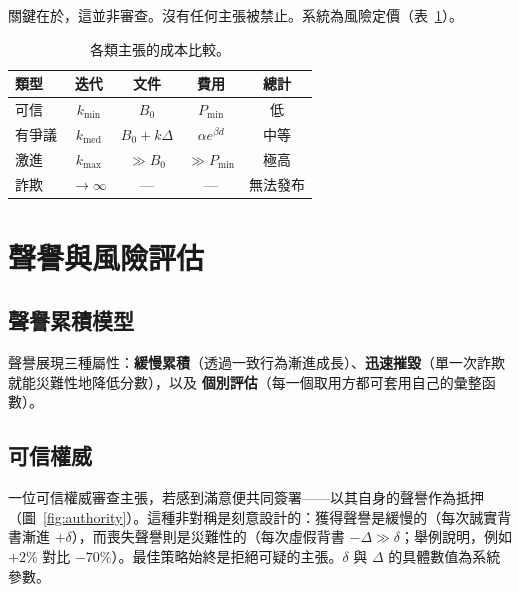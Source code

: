 \documentclass[11pt,a4paper,twocolumn]{article}
\begin{document}
關鍵在於，這並非審查。沒有任何主張被禁止。系統為風險定價（表~\ref{tab:costs}）。

\begin{table}[ht]
\centering
\caption{各類主張的成本比較。}
\label{tab:costs}
\footnotesize
\begin{tabular}{@{}lcccc@{}}
\toprule
\textbf{類型} & \textbf{迭代} & \textbf{文件} & \textbf{費用} & \textbf{總計} \\
\midrule
可信 & $k_{\min}$ & $B_0$ & $P_{\min}$ & 低 \\
有爭議 & $k_{\text{med}}$ & $B_0{+}k\Delta$ & $\alpha e^{\beta d}$ & 中等 \\
激進 & $k_{\max}$ & $\gg B_0$ & $\gg P_{\min}$ & 極高 \\
詐欺 & $\to\infty$ & --- & --- & 無法發布 \\
\bottomrule
\end{tabular}
\end{table}

\section{聲譽與風險評估}

\subsection{聲譽累積模型}

聲譽展現三種屬性：\textbf{緩慢累積}（透過一致行為漸進成長）、\textbf{迅速摧毀}（單一次詐欺就能災難性地降低分數），以及 \textbf{個別評估}（每一個取用方都可套用自己的彙整函數）。

\subsection{可信權威}

一位可信權威審查主張，若感到滿意便共同簽署——以其自身的聲譽作為抵押（圖~\ref{fig:authority}）。這種非對稱是刻意設計的：獲得聲譽是緩慢的（每次誠實背書漸進 $+\delta$），而喪失聲譽則是災難性的（每次虛假背書 $-\Delta \gg \delta$；舉例說明，例如 $+2\%$ 對比 $-70\%$）。最佳策略始終是拒絕可疑的主張。$\delta$ 與 $\Delta$ 的具體數值為系統參數。
\end{document}
